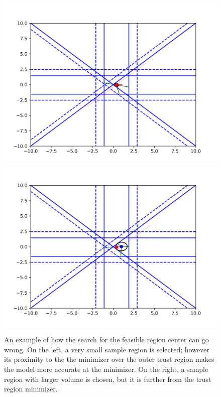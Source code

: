 \begin{figure}[ht]
    \centering
    \includegraphics[scale=0.4]{images/everything_runs_1.png}
    \includegraphics[scale=0.4]{images/everything_runs_2.png}
    \caption[An example of how the search for the sample region center can go wrong.]{
    	An example of how the search for the feasible region center can go wrong.  
     	On the left, a very small sample region is selected; however its proximity to the the minimizer over the outer trust region makes the model more accurate at the minimizer.
    	On the right, a sample region with larger volume is chosen, but it is further from the trust region minimizer.
	}
    \label{ellipse_runs_away}
\end{figure}


